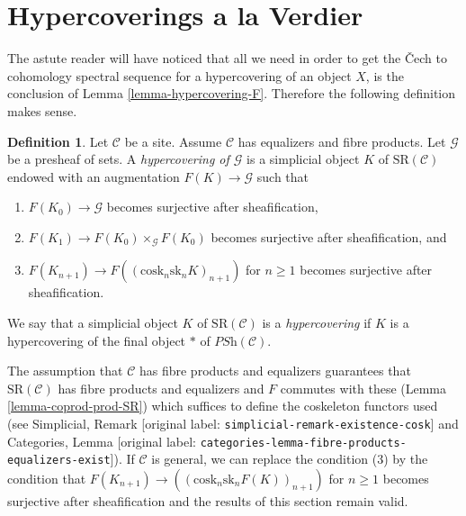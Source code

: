 \documentclass[10pt,a4paper]{article}
\theoremstyle{plain}
\theoremstyle{definition}
\newtheorem{definition}[subsection]{Definition}
\theoremstyle{remark}
\numberwithin{equation}{subsection}
\begin{document}
\section{Hypercoverings a la Verdier}
\label{section-hypercoverings-verdier}

\noindent
The astute reader will have noticed that all we need in order
to get the {\v C}ech to cohomology spectral sequence for a
hypercovering of an object $X$, is the
conclusion of Lemma \ref{lemma-hypercovering-F}.
Therefore the following definition makes sense.

\begin{definition}
\label{definition-hypercovering-variant}
Let $\mathcal{C}$ be a site. Assume $\mathcal{C}$ has equalizers
and fibre products. Let $\mathcal{G}$ be a presheaf of sets.
A {\it hypercovering of $\mathcal{G}$} is a simplicial object
$K$ of $\text{SR}(\mathcal{C})$ endowed with an augmentation
$F(K) \to \mathcal{G}$ such that
\begin{enumerate}
\item $F(K_0) \to \mathcal{G}$ becomes surjective
after sheafification,
\item $F(K_1) \to F(K_0) \times_\mathcal{G} F(K_0)$
becomes surjective after sheafification, and
\item $F(K_{n + 1}) \longrightarrow F((\text{cosk}_n \text{sk}_n K)_{n + 1})$
for $n \geq 1$ becomes surjective after sheafification.
\end{enumerate}
We say that a simplicial object $K$ of $\text{SR}(\mathcal{C})$
is a {\it hypercovering} if $K$ is a hypercovering of the final
object $*$ of $\textit{PSh}(\mathcal{C})$.
\end{definition}

\noindent
The assumption that $\mathcal{C}$ has fibre products and equalizers
guarantees that $\text{SR}(\mathcal{C})$ has fibre products
and equalizers and $F$ commutes with these
(Lemma \ref{lemma-coprod-prod-SR}) which suffices
to define the coskeleton functors used (see
Simplicial, Remark \textnormal{[original label: \nolinkurl{simplicial-remark-existence-cosk}]} and
Categories, Lemma \textnormal{[original label: \nolinkurl{categories-lemma-fibre-products-equalizers-exist}]}).
If $\mathcal{C}$ is general, we can replace the condition (3) by the
condition that
$F(K_{n + 1}) \longrightarrow ((\text{cosk}_n \text{sk}_n F(K))_{n + 1})$
for $n \geq 1$ becomes surjective after sheafification and the
results of this section remain valid.
\end{document}
